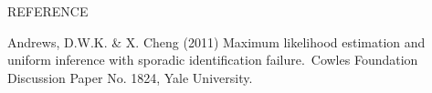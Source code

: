 \documentclass[12pt,titlepage,final,oneside,letterpaper]{article}
\begin{document}

\begin{center}
{\LARGE R}{\Large EFERENCE}
\end{center}

\begin{description}
\item Andrews, D.W.K. \& X. Cheng (2011) Maximum likelihood estimation and
uniform inference with sporadic identification failure.\ Cowles Foundation
Discussion Paper No. 1824, Yale University.
\end{description}
\end{document}
